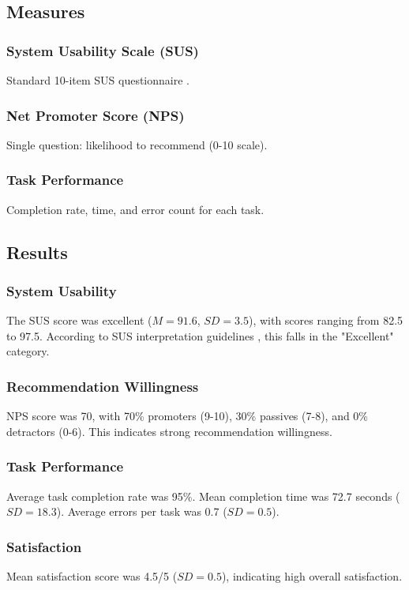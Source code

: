 \documentclass[preprint,12pt]{elsarticle}
\begin{document}
\subsection{Measures}

\subsubsection{System Usability Scale (SUS)}
Standard 10-item SUS questionnaire \citep{brooke1996sus}.

\subsubsection{Net Promoter Score (NPS)}
Single question: likelihood to recommend (0-10 scale).

\subsubsection{Task Performance}
Completion rate, time, and error count for each task.

\subsection{Results}

\subsubsection{System Usability}
The SUS score was excellent ($M=91.6$, $SD=3.5$), with scores ranging from
82.5 to 97.5. According to SUS interpretation guidelines \citep{bangor2008sus},
this falls in the "Excellent" category.

\subsubsection{Recommendation Willingness}
NPS score was 70, with 70\% promoters (9-10), 30\% passives (7-8), and 0\%
detractors (0-6). This indicates strong recommendation willingness.

\subsubsection{Task Performance}
Average task completion rate was 95\%. Mean completion time was 72.7 seconds
($SD=18.3$). Average errors per task was 0.7 ($SD=0.5$).

\subsubsection{Satisfaction}
Mean satisfaction score was 4.5/5 ($SD=0.5$), indicating high overall satisfaction.
\end{document}
